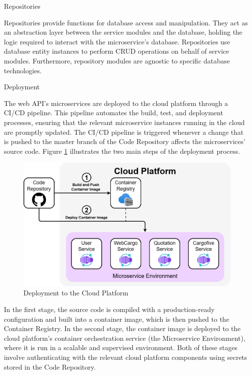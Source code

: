 \documentclass[12pt, reqno]{amsbook}
\makeatletter
\def\section{\@startsection{section}{1}%
      \z@{.5\linespacing\@plus.7\linespacing}{.25\linespacing}%
      {\normalfont\bfseries\flushleft}}
\def\subsection{\@startsection{subsection}{2}%
      \z@{.5\linespacing\@plus.7\linespacing}{.25\linespacing}%
      {\normalfont\bfseries\flushleft}}
\theoremstyle{definition}
\theoremstyle{definition}
\numberwithin{section}{chapter}
\numberwithin{table}{chapter}
\numberwithin{figure}{chapter}
\makeatother
\begin{document}
\subsection{Repositories}

Repositories provide functions for database access and manipulation. They act as an abstraction layer between the service modules and the database, holding the logic required to interact with the microservice's database. Repositories use database entity instances to perform \ac{CRUD} operations on behalf of service modules. Furthermore, repository modules are agnostic to specific database technologies.

\section{Deployment}
\label{Section:Deployment}

The web \ac{API}'s microservices are deployed to the cloud platform through a \ac{CI/CD} pipeline. This pipeline automates the build, test, and deployment processes, ensuring that the relevant microservice instances running in the cloud are promptly updated. The \ac{CI/CD} pipeline is triggered whenever a change that is pushed to the master branch of the Code Repository affects the microservices' source code. Figure \ref{Figure:Deployment} illustrates the two main steps of the deployment process.

\begin{figure}[H]
  \centering
  \includegraphics[width=0.9\linewidth]{images/Deployment.png}
  \caption{\label{Figure:Deployment}Deployment to the Cloud Platform}
\end{figure}

In the first stage, the source code is compiled with a production-ready configuration and built into a container image, which is then pushed to the Container Registry. In the second stage, the container image is deployed to the cloud platform's container orchestration service (the Microservice Environment), where it is run in a scalable and supervised environment. Both of these stages involve authenticating with the relevant cloud platform components using secrets stored in the Code Repository.
\end{document}
